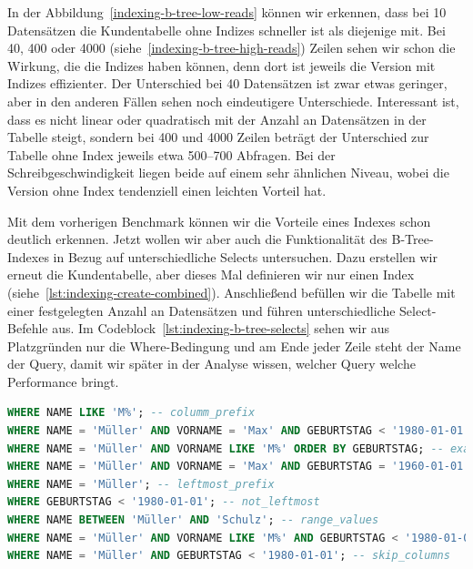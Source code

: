 In der Abbildung~\ref{indexing-b-tree-low-reads} können wir erkennen, dass bei 10 Datensätzen die Kundentabelle ohne Indizes schneller ist als diejenige mit.
Bei 40, 400 oder 4000 (siehe~\ref{indexing-b-tree-high-reads}) Zeilen sehen wir schon die Wirkung, die die Indizes haben können, denn dort ist jeweils die Version mit Indizes effizienter.
Der Unterschied bei 40 Datensätzen ist zwar etwas geringer, aber in den anderen Fällen sehen noch eindeutigere Unterschiede.
Interessant ist, dass es nicht linear oder quadratisch mit der Anzahl an Datensätzen in der Tabelle steigt, sondern bei 400 und 4000 Zeilen beträgt der Unterschied zur Tabelle ohne Index jeweils etwa 500--700 Abfragen.
Bei der Schreibgeschwindigkeit liegen beide auf einem sehr ähnlichen Niveau, wobei die Version ohne Index tendenziell einen leichten Vorteil hat.

Mit dem vorherigen Benchmark können wir die Vorteile eines Indexes schon deutlich erkennen.
Jetzt wollen wir aber auch die Funktionalität des B-Tree-Indexes in Bezug auf unterschiedliche Selects untersuchen.
Dazu erstellen wir erneut die Kundentabelle, aber dieses Mal definieren wir nur einen Index (siehe~\ref{lst:indexing-create-combined}).
Anschließend befüllen wir die Tabelle mit einer festgelegten Anzahl an Datensätzen und führen unterschiedliche Select-Befehle aus.
Im Codeblock~\ref{lst:indexing-b-tree-selects} sehen wir aus Platzgründen nur die Where-Bedingung und am Ende jeder Zeile steht der Name der Query, damit wir später in der Analyse wissen, welcher Query welche Performance bringt.

\newpage
\begin{lstlisting}[language=SQL,caption=Unterschiedliche Where-Bedingungen für B-Tree-Index,label={lst:indexing-b-tree-selects},basicstyle=\ttfamily\scriptsize]
WHERE NAME LIKE 'M%'; -- columm_prefix
WHERE NAME = 'Müller' AND VORNAME = 'Max' AND GEBURTSTAG < '1980-01-01'; -- combined_match_with_range
WHERE NAME = 'Müller' AND VORNAME LIKE 'M%' ORDER BY GEBURTSTAG; -- exact_with_prefix
WHERE NAME = 'Müller' AND VORNAME = 'Max' AND GEBURTSTAG = '1960-01-01'; -- full_match
WHERE NAME = 'Müller'; -- leftmost_prefix
WHERE GEBURTSTAG < '1980-01-01'; -- not_leftmost
WHERE NAME BETWEEN 'Müller' AND 'Schulz'; -- range_values
WHERE NAME = 'Müller' AND VORNAME LIKE 'M%' AND GEBURTSTAG < '1980-01-01'; -- range_with_like
WHERE NAME = 'Müller' AND GEBURTSTAG < '1980-01-01'; -- skip_columns
\end{lstlisting}
\vspace{-5pt}

